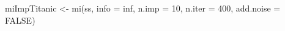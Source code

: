 \begin{Schunk}
\begin{Sinput}
 miImpTitanic <- mi(ss, info = inf, n.imp = 10,  n.iter = 400, add.noise = FALSE)
\end{Sinput}
\end{Schunk}
